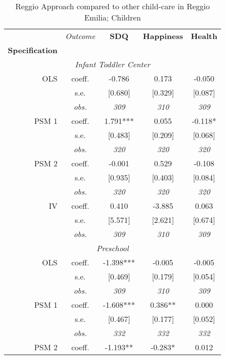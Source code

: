 \begin{table}[H] 
\caption{Reggio Approach compared to other child-care in Reggio Emilia; Children}
\label{tab:resultsChild-reggio}
 \begin{centering} 
\vspace{1ex}
\begin{tabular}{ r c ccc} 
\hline \hline 
 & {\textit{Outcome}} & \textbf{SDQ}  & \textbf{Happiness} & \textbf{Health}  \\ 
\textbf{Specification}  &  &  &  &  \\ 
\hline 
\multicolumn{5}{c}{\textit{Infant Toddler Center }} \\ 
\hline 

OLS	 & coeff.	 & -0.786	 & 0.173	 & -0.050	\\
	 & s.e.	 & [0.680]	 & [0.329]	 & [0.087]	\\
	 & \textit{obs.}	 & \textit{309}	 & \textit{310}	 & \textit{309}	\\
PSM 1	 & coeff.	 & 1.791***	 & 0.055	 & -0.118*	\\
	 & s.e.	 & [0.483]	 & [0.209]	 & [0.068]	\\
	 & \textit{obs.}	 & \textit{320}	 & \textit{320}	 & \textit{320}	\\
PSM 2	 & coeff.	 & -0.001	 & 0.529	 & -0.108	\\
	 & s.e.	 & [0.935]	 & [0.403]	 & [0.084]	\\
	 & \textit{obs.}	 & \textit{320}	 & \textit{320}	 & \textit{320}	\\
IV	 & coeff.	 & 0.410	 & -3.885	 & 0.063	\\
	 & s.e.	 & [5.571]	 & [2.621]	 & [0.674]	\\
	 & \textit{obs.}	 & \textit{309}	 & \textit{310}	 & \textit{309}	\\
\hline \multicolumn{5}{c}{\textit{Preschool }} \\ \hline
OLS	 & coeff.	 & -1.398***	 & -0.005	 & -0.005	\\
	 & s.e.	 & [0.469]	 & [0.179]	 & [0.054]	\\
	 & \textit{obs.}	 & \textit{309}	 & \textit{310}	 & \textit{309}	\\
PSM 1	 & coeff.	 & -1.608***	 & 0.386**	 & 0.000	\\
	 & s.e.	 & [0.467]	 & [0.177]	 & [0.052]	\\
	 & \textit{obs.}	 & \textit{332}	 & \textit{332}	 & \textit{332}	\\
PSM 2	 & coeff.	 & -1.193**	 & -0.283*	 & 0.012	\\

\end{tabular}
\end{centering}
\end{table}

